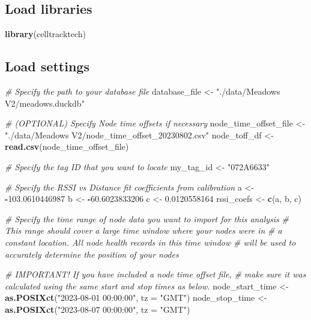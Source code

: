\documentclass[
]{book}
\newenvironment{Shaded}{\begin{snugshade}}{\end{snugshade}}
\newcommand{\AttributeTok}[1]{\textcolor[rgb]{0.13,0.29,0.53}{#1}}
\newcommand{\CommentTok}[1]{\textcolor[rgb]{0.56,0.35,0.01}{\textit{#1}}}
\newcommand{\FloatTok}[1]{\textcolor[rgb]{0.00,0.00,0.81}{#1}}
\newcommand{\FunctionTok}[1]{\textcolor[rgb]{0.13,0.29,0.53}{\textbf{#1}}}
\newcommand{\NormalTok}[1]{#1}
\newcommand{\OtherTok}[1]{\textcolor[rgb]{0.56,0.35,0.01}{#1}}
\newcommand{\SpecialCharTok}[1]{\textcolor[rgb]{0.81,0.36,0.00}{\textbf{#1}}}
\newcommand{\StringTok}[1]{\textcolor[rgb]{0.31,0.60,0.02}{#1}}
\begin{document}
\subsection{Load libraries}\label{load-libraries}

\begin{Shaded}
\begin{Highlighting}[]
\FunctionTok{library}\NormalTok{(celltracktech)}
\end{Highlighting}
\end{Shaded}

\subsection{Load settings}\label{load-settings-3}

\begin{Shaded}
\begin{Highlighting}[]
\CommentTok{\# Specify the path to your database file}
\NormalTok{database\_file }\OtherTok{\textless{}{-}} \StringTok{"./data/Meadows V2/meadows.duckdb"}

\CommentTok{\# (OPTIONAL) Specify Node time offsets if necessary}
\NormalTok{node\_time\_offset\_file }\OtherTok{\textless{}{-}} \StringTok{"./data/Meadows V2/node\_time\_offset\_20230802.csv"}
\NormalTok{node\_toff\_df }\OtherTok{\textless{}{-}} \FunctionTok{read.csv}\NormalTok{(node\_time\_offset\_file)}

\CommentTok{\# Specify the tag ID that you want to locate}
\NormalTok{my\_tag\_id }\OtherTok{\textless{}{-}} \StringTok{"072A6633"}

\CommentTok{\# Specify the RSSI vs Distance fit coefficients from calibration}
\NormalTok{a }\OtherTok{\textless{}{-}} \SpecialCharTok{{-}}\FloatTok{103.0610446987}
\NormalTok{b }\OtherTok{\textless{}{-}} \SpecialCharTok{{-}}\FloatTok{60.6023833206}
\NormalTok{c }\OtherTok{\textless{}{-}} \FloatTok{0.0120558164}
\NormalTok{rssi\_coefs }\OtherTok{\textless{}{-}} \FunctionTok{c}\NormalTok{(a, b, c)}

\CommentTok{\# Specify the time range of node data you want to import for this analysis}
\CommentTok{\#   This range should cover a large time window where your nodes were in}
\CommentTok{\#   a constant location.  All node health records in this time window}
\CommentTok{\#   will be used to accurately determine the position of your nodes}

\CommentTok{\# IMPORTANT! If you have included a node time offset file,}
\CommentTok{\# make sure it was calculated using the same start and stop times as below.}
\NormalTok{node\_start\_time }\OtherTok{\textless{}{-}} \FunctionTok{as.POSIXct}\NormalTok{(}\StringTok{"2023{-}08{-}01 00:00:00"}\NormalTok{, }\AttributeTok{tz =} \StringTok{"GMT"}\NormalTok{)}
\NormalTok{node\_stop\_time }\OtherTok{\textless{}{-}} \FunctionTok{as.POSIXct}\NormalTok{(}\StringTok{"2023{-}08{-}07 00:00:00"}\NormalTok{, }\AttributeTok{tz =} \StringTok{"GMT"}\NormalTok{)}


\end{Highlighting}
\end{Shaded}
\end{document}
